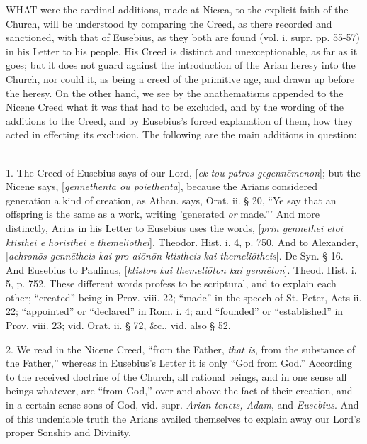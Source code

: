 
WHAT
were the cardinal additions, made at Nicæa, to the explicit faith of
the Church, will be understood by comparing the Creed, as there
recorded and sanctioned, with that of Eusebius, as they both are found
(vol. i. supr. pp. 55-57) in his Letter to his people. His Creed is
distinct and unexceptionable, as far as it goes; but it does not guard
against the introduction of the Arian heresy into the Church, nor
could it, as being a creed of the primitive age, and drawn up before
the heresy. On the other hand, we see by the anathematisms appended to
the Nicene Creed what it was that had to be excluded, and by the
wording of the additions to the Creed, and by Eusebius's forced
explanation of them, how they acted in effecting its exclusion. The
following are the main additions in question:—

1.
The Creed of Eusebius says of our Lord, [\emph{ek tou patros gegenn\={e}menon}];
but the Nicene says, [\emph{genn\={e}thenta ou poi\={e}thenta}],
because the Arians considered generation a kind of creation, as Athan.
says, Orat. ii. § 20, ``Ye say that an offspring is the same as a
work, writing 'generated \emph{or} made.''' And more distinctly, Arius
in his Letter to Eusebius uses the words, [\emph{prin genn\={e}th\={e}i
\={e}toi ktisth\={e}i \={e} horisth\={e}i \={e} themeli\={o}th\={e}i}].
Theodor. Hist. i. 4, p. 750. And to Alexander, [\emph{achron\={o}s
genn\={e}theis kai pro ai\={o}n\={o}n ktistheis kai themeli\={o}theis}].
De Syn. § 16. And Eusebius to Paulinus, [\emph{ktiston kai themeli\={o}ton
kai genn\={e}ton}]. Theod. Hist. i. 5, p. 752. These different
words profess to be scriptural, and to explain each other; ``created''
being in Prov. viii. 22; ``made'' in the speech of St. Peter, Acts ii.
22; ``appointed'' or ``declared'' in Rom. i. 4; and ``founded'' or ``established''
in Prov. viii. 23; vid. Orat. ii. § 72, \&c., vid. also § 52.

2.
We read in the Nicene Creed, ``from the Father, \emph{that is}, from
the substance of the Father,'' whereas in Eusebius's Letter it is only ``God
from God.'' According to the received doctrine of the Church, all
rational beings, and in one sense all beings whatever, are ``from God,''
over and above the fact of their creation, and in a certain sense sons
of God, vid. supr. \emph{Arian tenets, Adam}, and \emph{Eusebius}. And
of this undeniable truth the Arians availed themselves to explain away
our Lord's proper Sonship and Divinity.


